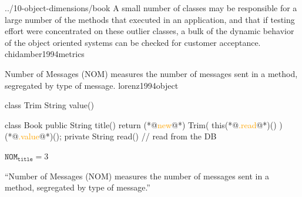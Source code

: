 \documentclass{article}
\begin{document}

\lnQuote
  {../10-object-dimensions/book}
  {A small number of classes may be responsible for a large number of the methods that executed in an application, and that if testing effort were concentrated on these outlier classes, a bulk of the dynamic behavior of the object oriented systems can be checked for customer acceptance.}
  {chidamber1994metrics}

  {Number of Messages (NOM) measures the number of messages sent in a method, segregated by type of message.}
  {lorenz1994object}

\begin{multicols}{2}
{\small\begin{ffcode}
class Trim
  String value()

class Book
  public String title()
    return (*@\textcolor{orange}{new}@*) Trim(
      this(*@\textcolor{orange}{.read}@*)()
    )(*@\textcolor{orange}{.value}@*)();
  private String read()
    // read from the DB
\end{ffcode}
}
\par\columnbreak\par
\(\texttt{NOM}_\texttt{title} = 3\)\par
``Number of Messages (NOM) measures the number of messages sent in a method, segregated by type of message.''
\end{multicols}
\plush{}
\end{document}
